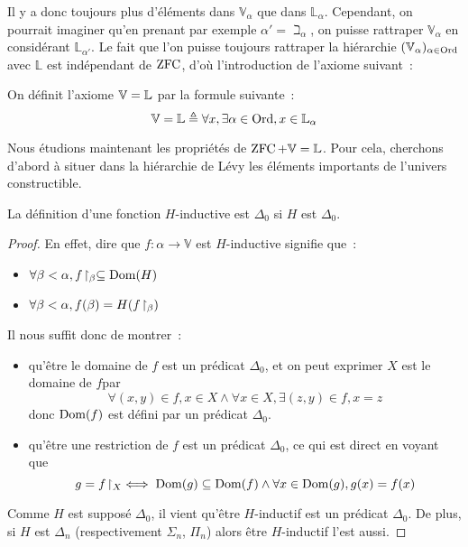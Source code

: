 Il y a donc toujours plus d'éléments dans $\mathbb V_\alpha$ que dans
$\mathbb L_\alpha$. Cependant, on pourrait imaginer qu'en prenant par exemple
$\alpha' = \beth_\alpha$, on puisse rattraper $\mathbb V_\alpha$ en considérant
$\mathbb L_{\alpha'}$. Le fait que l'on puisse toujours rattraper la hiérarchie
$(\mathbb V_{\alpha})_{\alpha\in\operatorname{Ord}}$ avec $\mathbb L$ est indépendant de $\operatorname{ZFC}$,
d'où l'introduction de l'axiome suivant~:

\begin{axiom}[V = L]\label{ax.VeqL}
  On définit l'axiome $\mathbb V = \mathbb L$ par la formule suivante~:
  \[\mathbb V = \mathbb L \triangleq \forall x, \exists \alpha \in \operatorname{Ord}, x \in \mathbb L_\alpha\]
\end{axiom}

Nous étudions maintenant les propriétés de $\operatorname{ZFC}+\mathbb V = \mathbb L$. Pour cela, cherchons
d'abord à situer dans la hiérarchie de Lévy les éléments importants de l'univers
constructible.

\begin{property}
  La définition d'une fonction $H$-inductive est $\Delta_0$ si $H$ est
  $\Delta_0$.
\end{property}

\begin{proof}
  En effet, dire que $f : \alpha \to \mathbb V$ est $H$-inductive signifie que~:
  \begin{itemize}
  \item $\forall \beta < \alpha, f\!\upharpoonright_{\beta}\subseteq \operatorname{Dom}(H)$
  \item $\forall \beta < \alpha, f(\beta) = H(f\!\upharpoonright_{\beta})$
  \end{itemize}
  Il nous suffit donc de montrer~:
  \begin{itemize}
  \item qu'être le domaine de $f$ est un prédicat $\Delta_0$, et on peut
    exprimer \og $X$ est le domaine de $f$\fg par
    \[\forall (x,y)\in f, x\in X \land \forall x \in X, \exists (z,y)\in f,
    x = z\]
    donc $\operatorname{Dom}(f)$ est défini par un prédicat $\Delta_0$.
  \item qu'être une restriction de $f$ est un prédicat $\Delta_0$, ce qui est
    direct en voyant que
    \[g = f\!\upharpoonright_{X} \iff \operatorname{Dom}(g)\subseteq\operatorname{Dom}(f)\land
    \forall x \in \operatorname{Dom}(g), g(x)=f(x)\]
  \end{itemize}
  Comme $H$ est supposé $\Delta_0$, il vient qu'être $H$-inductif est un
  prédicat $\Delta_0$. De plus, si $H$ est $\Delta_n$ (respectivement
  $\Sigma_n$, $\Pi_n$) alors être $H$-inductif l'est aussi.
\end{proof}

